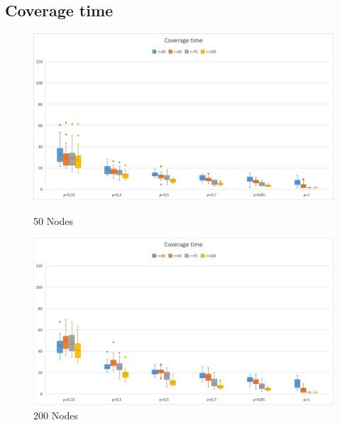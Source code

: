 \subsection{Coverage time}
\begin{figure}[H]
  \includegraphics[width=\linewidth]{./images/Time50Boxplot.png}
  \caption{50 Nodes}\label{fig:awesome_image1}
\endminipage\hfill
{}
  \includegraphics[width=\linewidth]{./images/Time200BoxplotScaled.png}
  \caption{200 Nodes}\label{fig:awesome_image2}
\endminipage
\end{figure}

